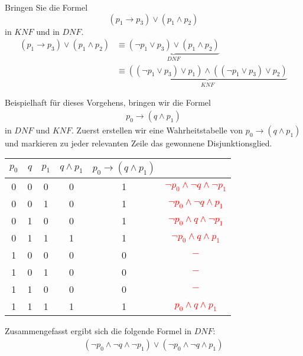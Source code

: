\begin{example}
Bringen Sie die Formel
\[
(p_1\to p_3)\lor(p_1\land p_2)
\]
in $KNF$ und in $DNF$.
\tcblower
\begin{align*}
(p_1\to p_3)\lor(p_1\land p_2)&\equiv \underbrace{(\neg p_1\lor p_3)\lor (p_1\land p_2)}_{DNF}\\
&\equiv \underbrace{((\neg p_1\lor p_3)\lor p_1)\land ((\neg p_1\lor p_3)\lor p_2)}_{KNF}
\end{align*}
\end{example}

\begin{example}
    Beispielhaft für dieses Vorgehens, bringen wir die Formel
    \begin{align*}
        p_0\to (q\land p_1)
    \end{align*}
    in $DNF$ und $KNF$. 
    \tcblower
    Zuerst erstellen wir eine Wahrheitstabelle von $p_0\to (q\land p_1)$ und markieren zu jeder relevanten Zeile das gewonnene Disjunktionsglied.
    \begin{center}
        \begin{tabular} {| c | c | c || c | c | c |}
            \hline
            $p_0$ & $q$ & $p_1$ & $q\land p_1$ & $p_0\to (q\land p_1)$ & \\
            \hline
            0 & 0 & 0 & 0 & 1 & \textcolor{red}{$\neg p_0 \land \neg q\land \neg p_1$}\\
            0 & 0 & 1 & 0 & 1 & \textcolor{red}{$\neg p_0 \land \neg q\land      p_1$}\\
            0 & 1 & 0 & 0 & 1 & \textcolor{red}{$\neg p_0 \land      q\land \neg p_1$}\\
            0 & 1 & 1 & 1 & 1 & \textcolor{red}{$\neg p_0 \land      q\land      p_1$}\\
            1 & 0 & 0 & 0 & 0 & \textcolor{red}{$-$}\\
            1 & 0 & 1 & 0 & 0 & \textcolor{red}{$-$}\\
            1 & 1 & 0 & 0 & 0 & \textcolor{red}{$-$}\\
            1 & 1 & 1 & 1 & 1 & \textcolor{red}{$     p_0 \land      q\land      p_1$}\\
            \hline
        \end{tabular}
    \end{center}
    \smallskip
    Zusammengefasst ergibt sich die folgende Formel in $DNF$:
    \begin{align*}
       (\neg p_0 \land \neg q\land \neg p_1)
       \lor (\neg p_0 \land \neg q\land      p_1)

\end{align*}
\end{example}
